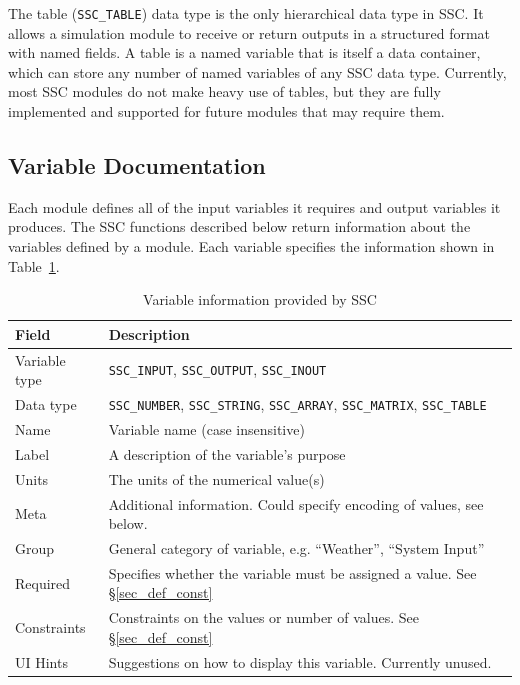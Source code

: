 \documentclass{article}
\begin{document}
The table (\texttt{SSC\_TABLE}) data type is the only hierarchical data type in SSC.  It allows a simulation module to receive or return outputs in a structured format with named fields.  A table is a named variable that is itself a data container, which can store any number of named variables of any SSC data type.  Currently, most SSC modules do not make heavy use of tables, but they are fully implemented and supported for future modules that may require them.

\subsection{Variable Documentation}
\label{sec_variable_docs}

Each module defines all of the input variables it requires and output variables it produces. The SSC functions described below return information about the variables defined by a module. Each variable specifies the information shown in Table~\ref{tab_varinfo}.

\begin{table}[ht]
\begin{center}
\begin{tabular}{ll}
Field & Description\\
\hline
Variable type & \texttt{SSC\_INPUT}, \texttt{SSC\_OUTPUT}, \texttt{SSC\_INOUT} \\
Data type & \texttt{SSC\_NUMBER}, \texttt{SSC\_STRING}, \texttt{SSC\_ARRAY}, \texttt{SSC\_MATRIX}, \texttt{SSC\_TABLE} \\
Name & Variable name (case insensitive) \\
Label & A description of the variable's purpose \\
Units & The units of the numerical value(s) \\
Meta & Additional information. Could specify encoding of values, see below. \\
Group & General category of variable, e.g. ``Weather'', ``System Input'' \\
Required & Specifies whether the variable must be assigned a value. See \S\ref{sec_def_const} \\
Constraints & Constraints on the values or number of values. See \S\ref{sec_def_const} \\
UI Hints & Suggestions on how to display this variable.  Currently unused. \\
\end{tabular}
\caption{Variable information provided by SSC}
\label{tab_varinfo}
\end{center}
\end{table}
\end{document}
